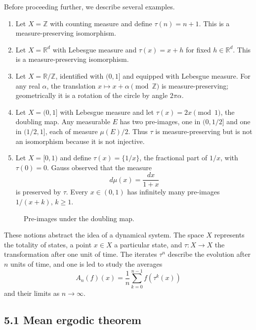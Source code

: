 \documentclass[11pt,openany]{book}
\begin{document}
Before proceeding further, we describe several examples.
\begin{enumerate}
\item[(i)] Let $X=\mathbb Z$ with counting measure and define $\tau(n)=n+1$. This is a measure-preserving isomorphism.
\item[(ii)] Let $X=\mathbb R^d$ with Lebesgue measure and $\tau(x)=x+h$ for fixed $h\in\mathbb R^d$. This is a measure-preserving isomorphism.
\item[(iii)] Let $X=\mathbb R/\mathbb Z$, identified with $(0,1]$ and equipped with Lebesgue measure. For any real $\alpha$, the translation $x\mapsto x+\alpha\pmod{\mathbb Z}$ is measure-preserving; geometrically it is a rotation of the circle by angle $2\pi\alpha$.
\item[(iv)] Let $X=(0,1]$ with Lebesgue measure and let $\tau(x)=2x\pmod1$, the doubling map. Any measurable $E$ has two pre-images, one in $(0,1/2]$ and one in $(1/2,1]$, each of measure $\mu(E)/2$. Thus $\tau$ is measure-preserving but is not an isomorphism because it is not injective.
\item[(v)] Let $X=[0,1)$ and define $\tau(x)=\{1/x\}$, the fractional part of $1/x$, with $\tau(0)=0$. Gauss observed that the measure
\[
d\mu(x)=\frac{dx}{1+x}
\]
is preserved by $\tau$. Every $x\in(0,1)$ has infinitely many pre-images $1/(x+k)$, $k\geq1$.
\end{enumerate}

\begin{figure}[ht]
\centering
{}
\caption{Pre-images under the doubling map.}
\end{figure}

These notions abstract the idea of a dynamical system. The space $X$ represents the totality of states, a point $x\in X$ a particular state, and $\tau:X\to X$ the transformation after one unit of time. The iterates $\tau^n$ describe the evolution after $n$ units of time, and one is led to study the averages
\begin{equation}
A_n(f)(x)=\frac1n\sum_{k=0}^{n-1}f(\tau^k(x))
\tag{19}
\end{equation}
and their limits as $n\to\infty$.

\subsection*{5.1 Mean ergodic theorem}
\end{document}
